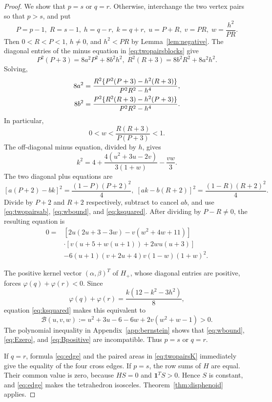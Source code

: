 \documentclass[11pt]{article}
\theoremstyle{definition}
\theoremstyle{remark}
\newcommand{\one}{\mathbf 1}
\newcommand{\ph}{\varphi}
\begin{document}
\begin{proof}
We show that $p=s$ or $q=r$. Otherwise, interchange the two vertex pairs so that $p>s$, and put
\[
P=p-1,\; R=s-1,\; h=q-r,\; k=q+r,
\; u=P+R,\; v=PR,\; w=\frac{h^2}{PR}.
\]
Then $0<R<P<1$, $h\ne0$, and $h^2<PR$ by Lemma~\ref{lem:negative}. The diagonal entries of the minus equation in \eqref{eq:twopairsblocks} give
\[
P^2(P+3)=8a^2P^2+8b^2h^2,
\; R^2(R+3)=8b^2R^2+8a^2h^2.
\]
Solving,
\begin{align}
8a^2&=\frac{R^2\{P^2(P+3)-h^2(R+3)\}}{P^2R^2-h^4},\notag\\
8b^2&=\frac{P^2\{R^2(R+3)-h^2(P+3)\}}{P^2R^2-h^4}.
\label{eq:twopairsab}
\end{align}
In particular,
\begin{equation}
0<w<\frac{R(R+3)}{P(P+3)}<1.
\label{eq:wbound}
\end{equation}
The off-diagonal minus equation, divided by $h$, gives
\begin{equation}
k^2=4+\frac{4(u^2+3u-2v)}{3(1+w)}-\frac{vw}{3}.
\label{eq:ksquared}
\end{equation}
The two diagonal plus equations are
\[
[a(P+2)-bk]^2=\frac{(1-P)(P+2)^2}{4},
\;
[ak-b(R+2)]^2=\frac{(1-R)(R+2)^2}{4}.
\]
Divide by $P+2$ and $R+2$ respectively, subtract to cancel $ab$, and use \eqref{eq:twopairsab}, \eqref{eq:wbound}, and \eqref{eq:ksquared}. After dividing by $P-R\ne0$, the resulting equation is
\begin{equation}
\begin{aligned}
0={}&[2u(2u+3-3w)-v(w^2+4w+11)]\\
&\cdot[v(u+5+w(u+1))+2wu(u+3)]\\
&-6(u+1)(v+2u+4)v(1-w)(1+w)^2.
\end{aligned}
\label{eq:Ezero}
\end{equation}

The positive kernel vector $(\alpha,\beta)^T$ of $H_+$, whose diagonal entries are positive, forces $\ph(q)+\ph(r)<0$. Since
\[
\ph(q)+\ph(r)=\frac{k(12-k^2-3h^2)}8,
\]
equation \eqref{eq:ksquared} makes this equivalent to
\begin{equation}
\mathcal B(u,v,w):=u^2+3u-6-6w+2v(w^2+w-1)>0.
\label{eq:Bpositive}
\end{equation}
The polynomial inequality in Appendix~\ref{app:bernstein} shows that \eqref{eq:wbound}, \eqref{eq:Ezero}, and \eqref{eq:Bpositive} are incompatible. Thus $p=s$ or $q=r$.

If $q=r$, formula \eqref{eq:edge} and the paired areas in \eqref{eq:twopairsK} immediately give the equality of the four cross edges. If $p=s$, the row sums of $H$ are equal. Their common value is zero, because $HS=0$ and $\one^TS>0$. Hence $S$ is constant, and \eqref{eq:edge} makes the tetrahedron isosceles. Theorem~\ref{thm:disphenoid} applies.
\end{proof}
\end{document}
